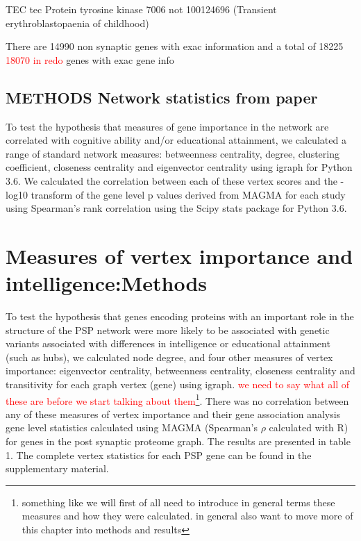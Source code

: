 TEC tec Protein tyrosine kinase 7006 not 100124696 (Transient erythroblastopaenia of childhood)

There are 14990 non synaptic genes with exac information and a total of 18225 \textcolor{red}{18070 in redo} genes with exac gene info



\subsection{METHODS Network statistics from paper}
\label{sec: network statistics from paper}

To test the hypothesis that measures of gene importance in the network are correlated with cognitive ability and/or educational attainment, we calculated a range of standard network measures: betweenness centrality, degree, clustering coefficient, closeness centrality and eigenvector centrality using igraph for Python 3.6. \cite{csardi2006igraph}  We calculated the correlation between each of these vertex scores and the -log10 transform of the gene level p values derived from MAGMA for each study using Spearman’s rank correlation using the Scipy stats package for Python 3.6. \section{Measures of vertex importance and intelligence:Methods}

\label{sec:Measurs of vertex importance from paper}
To test the hypothesis that genes encoding proteins with an important role in the structure of the PSP network were more likely to be associated with genetic variants associated with differences in intelligence or educational attainment (such as hubs), we calculated node degree, and four other measures of vertex importance: eigenvector centrality, betweenness centrality, closeness centrality and transitivity for each graph vertex (gene) using igraph. \cite{csardi2006igraph} \textcolor{red}{we need to say what all of these are before we start talking about them}\footnote{something like we will first of all need to introduce in general terms these measures and how they were calculated. in general also want to move more of this chapter into methods and results}. There was no correlation between any of these measures of vertex importance and their gene association analysis gene level statistics calculated using MAGMA (Spearman’s $\rho$ calculated with R) for genes in the post synaptic proteome graph. The results are presented in table 1. The complete vertex statistics for each PSP gene can be found in the supplementary material. 

